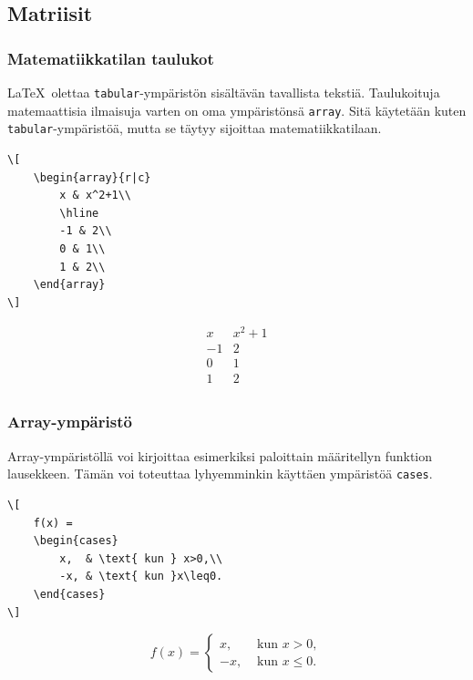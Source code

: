 \documentclass[handout,hyperref={colorlinks=true}]{beamer}
\theoremstyle{remark}
\newcommand{\vaihto}{\\ \vspace{10pt}}
\begin{document}
\subsection{Matriisit}
\begin{frame}[fragile]
    \frametitle{Matematiikkatilan taulukot}
    \LaTeX\ olettaa \verb-tabular--ympäristön sisältävän tavallista tekstiä. Taulukoituja matemaattisia ilmaisuja varten on oma ympäristönsä \verb-array-. Sitä käytetään kuten \verb-tabular--ympäristöä, mutta se täytyy sijoittaa matematiikkatilaan.\vaihto

    \begin{minipage}{5cm}
        \begin{scriptsize}
            \begin{Verbatim}[frame=single]
\[
    \begin{array}{r|c}
        x & x^2+1\\
        \hline
        -1 & 2\\
        0 & 1\\
        1 & 2\\
    \end{array}
\]
            \end{Verbatim}
        \end{scriptsize}
    \end{minipage}
    \begin{minipage}{3cm}
        \[
        \begin{array}{r|c}
            x & x^2+1\\
            \hline
            -1 & 2\\
            0 & 1\\
            1 & 2\\
        \end{array}
        \]
    \end{minipage}
\end{frame}
\begin{frame}[fragile]
    \frametitle{Array-ympäristö}
    Array-ympäristöllä voi kirjoittaa esimerkiksi paloittain määritellyn funktion lausekkeen. Tämän voi toteuttaa lyhyemminkin käyttäen ympäristöä \verb-cases-. 
    \begin{Verbatim}[frame=single]
\[
    f(x) =
    \begin{cases}
        x,  & \text{ kun } x>0,\\
        -x, & \text{ kun }x\leq0.
    \end{cases}
\]
    \end{Verbatim}
    \begin{framed}
        \[
            f(x) =
            \begin{cases}
                x,  & \text{ kun } x>0,\\
                -x, & \text{ kun }x\leq0.
            \end{cases}
        \]
    \end{framed}
\end{frame}
\end{document}
